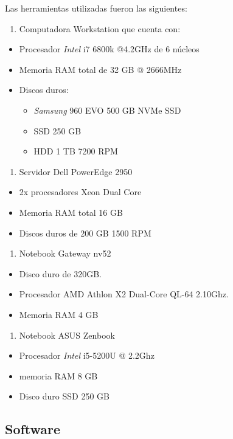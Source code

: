 \documentclass[12pt,twoside]{reedthesis}
\providecommand{\tightlist}{%
  \setlength{\itemsep}{0pt}\setlength{\parskip}{0pt}}
\begin{document}
Las herramientas utilizadas fueron las siguientes:
\begin{enumerate}
\def\labelenumi{\arabic{enumi}.}
\tightlist
\item
  Computadora Workstation que cuenta con:
\end{enumerate}
\begin{itemize}
\tightlist
\item
  Procesador \emph{Intel} i7 6800k @4.2GHz de 6 núcleos
\item
  Memoria RAM total de 32 GB @ 2666MHz
\item
  Discos duros:
  \begin{itemize}
  \tightlist
  \item
    \emph{Samsung} 960 EVO 500 GB NVMe SSD
  \item
    SSD 250 GB
  \item
    HDD 1 TB 7200 RPM
  \end{itemize}
\end{itemize}
\begin{enumerate}
\def\labelenumi{\arabic{enumi}.}
\setcounter{enumi}{1}
\tightlist
\item
  Servidor Dell PowerEdge 2950
\end{enumerate}
\begin{itemize}
\tightlist
\item
  2x procesadores Xeon Dual Core
\item
  Memoria RAM total 16 GB
\item
  Discos duros de 200 GB 1500 RPM
\end{itemize}
\begin{enumerate}
\def\labelenumi{\arabic{enumi}.}
\setcounter{enumi}{2}
\tightlist
\item
  Notebook Gateway nv52
\end{enumerate}
\begin{itemize}
\tightlist
\item
  Disco duro de 320GB.
\item
  Procesador AMD Athlon X2 Dual-Core QL-64 2.10Ghz.
\item
  Memoria RAM 4 GB
\end{itemize}
\begin{enumerate}
\def\labelenumi{\arabic{enumi}.}
\setcounter{enumi}{3}
\tightlist
\item
  Notebook ASUS Zenbook
\end{enumerate}
\begin{itemize}
\tightlist
\item
  Procesador \emph{Intel} i5-5200U @ 2.2Ghz
\item
  memoria RAM 8 GB
\item
  Disco duro SSD 250 GB
\end{itemize}
\hypertarget{software}{%
\subsection{Software}\label{software}}
\end{document}
